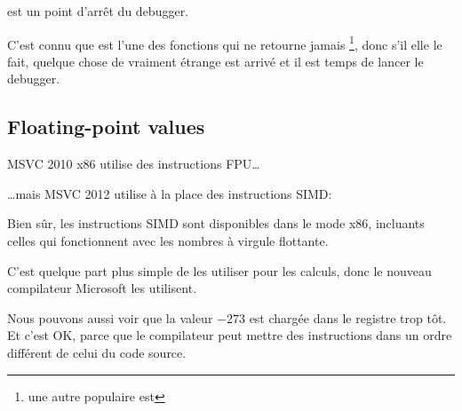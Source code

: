  est un point d'arrêt du debugger.

C'est connu que  est l'une des fonctions qui ne retourne jamais
\footnote{une autre populaire est },
donc s'il elle le fait, quelque chose de vraiment étrange est arrivé et il est temps de lancer le debugger.

\subsection{Floating-point values}



MSVC 2010 x86 utilise des instructions \ac{FPU}\dots



\dots mais MSVC 2012 utilise à la place des instructions \ac{SIMD}:



Bien sûr, les instructions \ac{SIMD} sont disponibles dans le mode x86,
incluants celles qui fonctionnent avec les nombres à virgule flottante.

C'est quelque part plus simple de les utiliser pour les calculs, donc le nouveau compilateur Microsoft les utilisent.

Nous pouvons aussi voir que la valeur $-273$
est chargée dans le registre  trop tôt.
Et c'est OK, parce que le compilateur peut mettre des instructions dans un ordre
différent de celui du code source.
